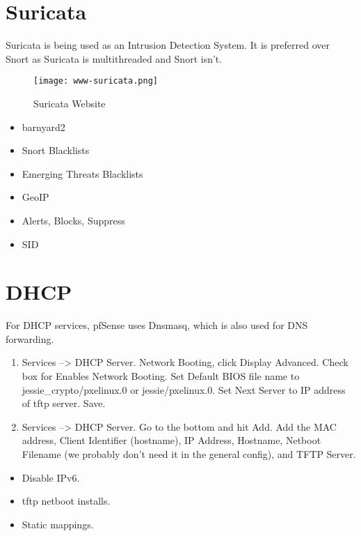 \section{Suricata}
Suricata is being used as an Intrusion Detection System.
It is preferred over Snort as Suricata is multithreaded and Snort isn't.

\begin{figure}[h!]
\texttt{[image: www-suricata.png]}
 \caption{Suricata Website}
 \label{fig:www-suricata}
\end{figure}

\begin{itemize}
 \item barnyard2
 \item Snort Blacklists
 \item Emerging Threats Blacklists
 \item GeoIP
 \item Alerts, Blocks, Suppress
 \item SID
\end{itemize}


\section{DHCP}
For DHCP services, pfSense uses Dnsmasq, which is also used for DNS
forwarding.


\begin{enumerate}
 \item Services --> DHCP Server. Network Booting, click Display Advanced. Check box for Enables Network Booting. Set Default BIOS file name to jessie\_crypto/pxelinux.0 or jessie/pxelinux.0. Set Next Server to IP address of tftp server. Save.
 \item Services --> DHCP Server. Go to the bottom and hit Add. Add the MAC address, Client Identifier (hostname), IP Address, Hostname, Netboot Filename (we probably don't need it in the general config), and TFTP Server.
\end{enumerate}

\begin{itemize}
 \item Disable IPv6.
 \item tftp netboot installs.
 \item Static mappings.
\end{itemize}


